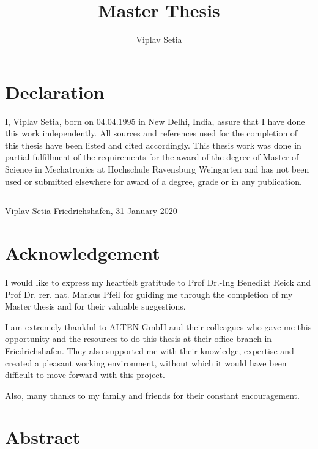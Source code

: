 \documentclass[%
xelatex,
	oneside,		%
	12pt,			%
	parskip=half,	%
	abstracton,
	chapterprefix=true%
    appendixprefix=true]
{scrbook}
\title{Master Thesis}
\author{Viplav Setia}
\begin{document}
\section*{\Large\normalfont\bfseries Declaration}

I, Viplav Setia, born on 04.04.1995 in New Delhi, India, assure that I have done this work independently. All sources and references used for the completion of this
thesis have been listed and cited accordingly. This thesis work was done in
partial fulfillment of the requirements for the award of the degree of Master of
Science in Mechatronics at Hochschule Ravensburg Weingarten and has not been
used or submitted elsewhere for award of a degree, grade or in any publication. \newline


\rule{5cm}{.4pt}

Viplav Setia \newline
Friedrichshafen, 31 January 2020
\clearpage

		\section*{\Large\normalfont\bfseries Acknowledgement}

I would like to express my heartfelt
gratitude to Prof Dr.-Ing Benedikt Reick and Prof Dr. rer. nat. Markus Pfeil for guiding me through the completion of my Master thesis and for their valuable
suggestions.

I am extremely thankful to ALTEN GmbH and their colleagues who gave me this opportunity and the resources to do this thesis at their office branch in Friedrichshafen. They also supported me with their knowledge,  expertise and created a pleasant working environment, without which it would have been difficult to move forward with this project.

Also, many thanks to my family and friends for their constant encouragement.				
	\clearpage
		\section*{\Large\normalfont\bfseries Abstract}
\end{document}
